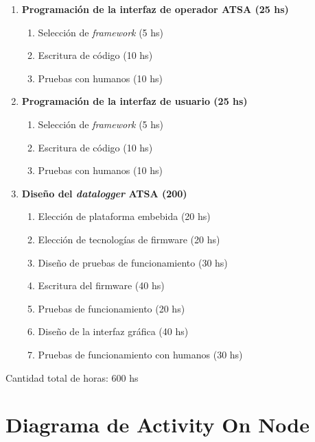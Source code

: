 \documentclass[
12pt,
spanish,
singlespacing,
parskip,
headsepline,]{article}
\begin{document}
\begin{enumerate}
\begin{enumerate}
	\end{enumerate}
	\item \textbf{Programación de la interfaz de operador ATSA (25 hs)}
	\begin{enumerate}
		\item Selección de \emph{framework} (5 hs)
		\item Escritura de código (10 hs)
		\item Pruebas con humanos (10 hs)
	\end{enumerate}
	\item \textbf{Programación de la interfaz de usuario (25 hs)}
	\begin{enumerate}
		\item Selección de \emph{framework} (5 hs)
		\item Escritura de código (10 hs)
		\item Pruebas con humanos (10 hs)
	\end{enumerate}
	\item \textbf{Diseño del \emph{datalogger} ATSA (200)}
	\begin{enumerate}
		\item Elección de plataforma embebida (20 hs)
		\item Elección de tecnologías de firmware (20 hs)
		\item Diseño de pruebas de funcionamiento (30 hs)
		\item Escritura del firmware (40 hs)
		\item Pruebas de funcionamiento (20 hs)
		\item Diseño de la interfaz gráfica (40 hs)
		\item Pruebas de funcionamiento con humanos (30 hs)
	\end{enumerate}
\end{enumerate}

Cantidad total de horas: 600 hs

\section{Diagrama de Activity On Node}
\end{document}
